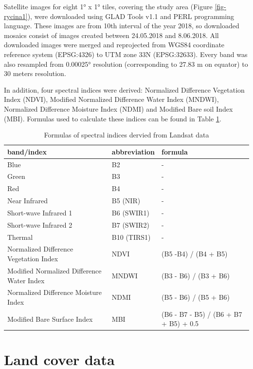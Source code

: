 \documentclass{amuthesis}
\begin{document}
Satellite images for eight 1° x 1° tiles, covering the study area
(Figure \ref{fig-rycina1}), were downloaded using GLAD Tools v1.1 and
PERL programming language. These images are from 10th interval of the
year 2018, so downloaded mosaics consist of images created between
24.05.2018 and 8.06.2018. All downloaded images were merged and
reprojected from WGS84 coordinate reference system (EPSG:4326) to UTM
zone 33N (EPSG:32633). Every band was also resampled from 0.00025°
resolution (corresponding to 27.83 m on equator) to 30 meters
resolution.

In addition, four spectral indices were derived: Normalized Difference
Vegetation Index (NDVI), Modified Normalized Difference Water Index
(MNDWI), Normalized Difference Moisture Index (NDMI) and Modified Bare
soil Index (MBI). Formulas used to calculate these indices can be found
in Table \ref{tbl-tabela1}.

\hypertarget{tbl-tabela1}{}
\begin{table}
\caption{\label{tbl-tabela1}Formulas of spectral indices dervied from Landsat data }\tabularnewline

\centering
\begin{tabular}{|>{\raggedright\arraybackslash}p{4cm}|>{}l|>{}l|}
\toprule
\textbf{band/index} & \textbf{abbreviation} & \textbf{formula}\\
\midrule
Blue & B2 & -\\
\hline
Green & B3 & -\\
\hline
Red & B4 & -\\
\hline
Near Infrared & B5 (NIR) & -\\
\hline
Short-wave Infrared 1 & B6 (SWIR1) & -\\
\hline
Short-wave Infrared 2 & B7 (SWIR2) & -\\
\hline
Thermal & B10 (TIRS1) & -\\
\hline
Normalized Difference Vegetation Index & NDVI & (B5 -B4) / (B4 + B5)\\
\hline
Modified Normalized Difference Water Index & MNDWI & (B3 - B6) / (B3 + B6)\\
\hline
Normalized Difference Moisture Index & NDMI & (B5 - B6) / (B5 + B6)\\
\hline
Modified Bare Surface Index & MBI & (B6 - B7 - B5) / (B6 + B7 + B5) + 0.5\\
\bottomrule
\end{tabular}
\end{table}

\hypertarget{sec-landcover}{%
\section{Land cover data}\label{sec-landcover}}
\end{document}
